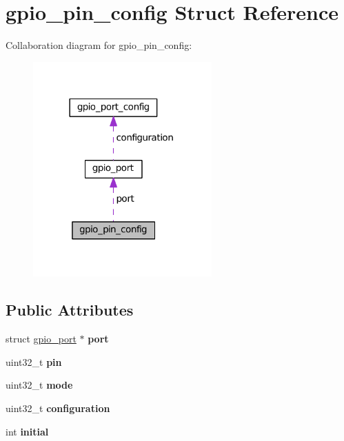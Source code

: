 \hypertarget{structgpio__pin__config}{}\section{gpio\+\_\+pin\+\_\+config Struct Reference}
\label{structgpio__pin__config}


Collaboration diagram for gpio\+\_\+pin\+\_\+config\+:\nopagebreak
\begin{figure}[H]
\begin{center}
\leavevmode
\includegraphics[width=194pt]{structgpio__pin__config__coll__graph}
\end{center}
\end{figure}
\subsection*{Public Attributes}
\begin{DoxyCompactItemize}
\item 
\hypertarget{structgpio__pin__config_a72fc1227f3fab0d1e2485d8f4bed6dbc}{}struct \hyperlink{structgpio__port}{gpio\+\_\+port} $\ast$ {\bfseries port}\label{structgpio__pin__config_a72fc1227f3fab0d1e2485d8f4bed6dbc}

\item 
\hypertarget{structgpio__pin__config_afb9b5bbf5c85e22120e7ef67964b621a}{}uint32\+\_\+t {\bfseries pin}\label{structgpio__pin__config_afb9b5bbf5c85e22120e7ef67964b621a}

\item 
\hypertarget{structgpio__pin__config_a799cc96abd94ffdc23f888a9ed1556ca}{}uint32\+\_\+t {\bfseries mode}\label{structgpio__pin__config_a799cc96abd94ffdc23f888a9ed1556ca}

\item 
\hypertarget{structgpio__pin__config_a1ba8ae193e2164dd8c4238c81d9200e4}{}uint32\+\_\+t {\bfseries configuration}\label{structgpio__pin__config_a1ba8ae193e2164dd8c4238c81d9200e4}

\item 
\hypertarget{structgpio__pin__config_a195076654c4665c2dae2702f4bce5dfd}{}int {\bfseries initial}\label{structgpio__pin__config_a195076654c4665c2dae2702f4bce5dfd}

\end{DoxyCompactItemize}


